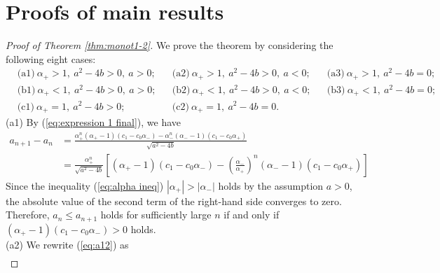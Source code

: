 \documentclass[a4paper,11pt,reqno]{amsart}
\theoremstyle{plain}
\theoremstyle{definition}
\begin{document}
\section{Proofs of main results}\label{section:proof}
\begin{proof}[Proof of Theorem \ref{thm:monot1-2}]
We prove the theorem by considering the following eight cases: 
\begin{align*}
  &\textrm{(a1)}\ \alpha _{+}>1, \ a^{2}-4b>0, \ a>0;& 
  &\textrm{(a2)}\ \alpha _{+}>1, \ a^{2}-4b>0, \ a<0;&
  &\textrm{(a3)}\ \alpha _{+}>1, \ a^{2}-4b=0;& \\
  &\textrm{(b1)}\ \alpha _{+}<1, \ a^{2}-4b>0, \ a>0;& 
  &\textrm{(b2)}\ \alpha _{+}<1, \ a^{2}-4b>0, \ a<0;&
  &\textrm{(b3)}\ \alpha _{+}<1, \ a^{2}-4b=0;& \\
  &\textrm{(c1)}\ \alpha _{+}=1, \ a^{2}-4b>0;& 
  &\textrm{(c2)}\ \alpha _{+}=1, \ a^{2}-4b=0.&
  && 
\end{align*}
(a1) 
By (\ref{eq:expression 1 final}), we have
\begin{align}
\label{eq:a12}
a_{n+1}-a_{n}
   &=
   \frac{\alpha _{+}^{n}(\alpha _{+}-1)(c_{1}-c_{0}\alpha _{-})-\alpha _{-}^{n}(\alpha _{-}-1)(c_{1}-c_{0}\alpha _{+})}{\sqrt{a^{2}-4b}} %
\\
\label{eq:a1}
   &=
   \frac{\alpha _{+}^{n}}{\sqrt{a^{2}-4b}}
   \left[(\alpha _{+}-1)(c_{1}-c_{0}\alpha _{-})-\left(\frac{\alpha _{-}}{\alpha _{+}}\right)^{n}(\alpha _{-}-1)(c_{1}-c_{0}\alpha _{+})\right]
\end{align}
Since the inequality (\ref{eq:alpha ineq}) $|\alpha _{+}|> |\alpha _{-}|$ holds by the assumption $a>0$,  
the absolute value of the second term of the right-hand side converges to zero. 
Therefore, $a_{n}\leq a_{n+1}$ holds for sufficiently large $n$ if and only if 
$(\alpha _{+}-1)(c_{1}-c_{0}\alpha _{-})> 0$ holds. 
\\
(a2)
We rewrite (\ref{eq:a12}) as 
\begin{align}
\label{eq:a2}

\end{align}
\end{proof}
\end{document}
